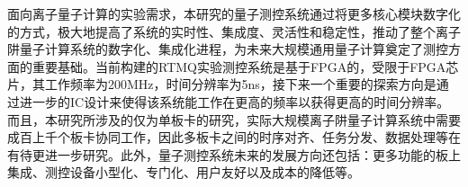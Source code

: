 \begin{conclusion}
面向离子量子计算的实验需求，本研究的量子测控系统通过将更多核心模块数字化的方式，极大地提高了系统的实时性、集成度、灵活性和稳定性，推动了整个离子阱量子计算系统的数字化、集成化进程，为未来大规模通用量子计算奠定了测控方面的重要基础。当前构建的RTMQ实验测控系统是基于FPGA的，受限于FPGA芯片，其工作频率为200MHz，时间分辨率为5ns，接下来一个重要的探索方向是通过进一步的IC设计来使得该系统能工作在更高的频率以获得更高的时间分辨率。而且，本研究所涉及的仅为单板卡的研究，实际大规模离子阱量子计算系统中需要成百上千个板卡协同工作，因此多板卡之间的时序对齐、任务分发、数据处理等在有待更进一步研究。此外，量子测控系统未来的发展方向还包括：更多功能的板上集成、测控设备小型化、专门化、用户友好以及成本的降低等。


\end{conclusion}



